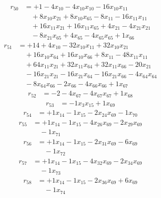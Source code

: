 \[\begin{aligned}
r_{50} &= + 1 - 4 x_{10} - 4 x_{10} x_{10} - 16 x_{10} x_{11} \\
 &\quad + 8 x_{10} x_{21} + 8 x_{10} x_{65} - 8 x_{11} - 16 x_{11} x_{11} \\
 &\quad + 16 x_{11} x_{21} + 16 x_{11} x_{65} + 4 x_{21} - 4 x_{21} x_{21} \\
 &\quad - 8 x_{21} x_{65} + 4 x_{65} - 4 x_{65} x_{65} + 1 x_{66}
\end{aligned}\]
\[\begin{aligned}
r_{51} &= + 14 + 4 x_{10} - 32 x_{10} x_{11} + 32 x_{10} x_{21} \\
 &\quad + 16 x_{10} x_{64} + 16 x_{10} x_{66} + 8 x_{11} - 48 x_{11} x_{11} \\
 &\quad + 64 x_{11} x_{21} + 32 x_{11} x_{64} + 32 x_{11} x_{66} - 20 x_{21} \\
 &\quad - 16 x_{21} x_{21} - 16 x_{21} x_{64} - 16 x_{21} x_{66} - 4 x_{64} x_{64} \\
 &\quad - 8 x_{64} x_{66} - 2 x_{66} - 4 x_{66} x_{66} + 1 x_{67}
\end{aligned}\]
\[\begin{aligned}
r_{52} &= - 2 - 4 x_{67} - 4 x_{67} x_{67} + 1 x_{68}
\end{aligned}\]
\[\begin{aligned}
r_{53} &= - 1 x_{3} x_{15} + 1 x_{69}
\end{aligned}\]
\[\begin{aligned}
r_{54} &= + 1 x_{14} - 1 x_{15} - 2 x_{24} x_{69} - 1 x_{70}
\end{aligned}\]
\[\begin{aligned}
r_{55} &= + 1 x_{14} - 1 x_{15} - 4 x_{26} x_{69} - 2 x_{29} x_{69} \\
 &\quad - 1 x_{71}
\end{aligned}\]
\[\begin{aligned}
r_{56} &= + 1 x_{14} - 1 x_{15} - 2 x_{31} x_{69} - 6 x_{69} \\
 &\quad - 1 x_{72}
\end{aligned}\]
\[\begin{aligned}
r_{57} &= + 1 x_{14} - 1 x_{15} - 4 x_{32} x_{69} - 2 x_{34} x_{69} \\
 &\quad - 1 x_{73}
\end{aligned}\]
\[\begin{aligned}
r_{58} &= + 1 x_{14} - 1 x_{15} - 2 x_{36} x_{69} + 6 x_{69} \\
 &\quad - 1 x_{74}
\end{aligned}\]
